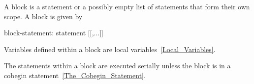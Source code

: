 
A block is a statement or a possibly empty list of statements that
form their own scope.  A block is given by
\begin{syntax}
block-statement:
  { statement [[,...]] }
  { }
\end{syntax}

Variables defined within a block are local
variables~\ref{Local_Variables}.

The statements within a block are executed serially unless the block
is in a cobegin statement~\ref{The_Cobegin_Statement}.
